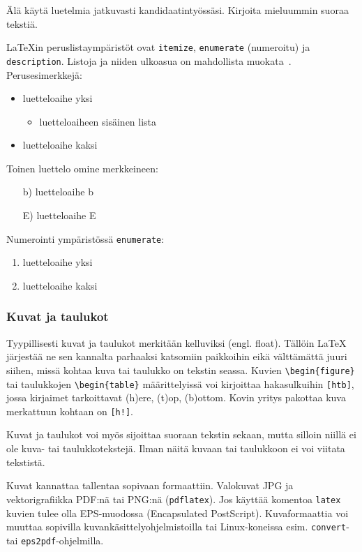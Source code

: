Älä käytä luetelmia jatkuvasti kandidaatintyössäsi. Kirjoita
mieluummin suoraa tekstiä.

\LaTeX{}in peruslistaympäristöt ovat \verb!itemize!, 
\verb!enumerate! (numeroitu)
ja \verb!description!. Listoja ja niiden ulkoasua on
mahdollista muokata~\citep[katso esim.][s. 128]{mittelbach2004}. 
Perusesimerkkejä:
%
\begin{itemize}
\item luetteloaihe yksi
 \begin{itemize}
 \item luetteloaiheen sisäinen lista
 \end{itemize}
\item luetteloaihe kaksi
\end{itemize}

Toinen luettelo omine merkkeineen:
%
\begin{itemize}
\item[b)] luetteloaihe b
\item[E)] luetteloaihe E
\end{itemize}

Numerointi ympäristössä \verb!enumerate!:
%
\begin{enumerate}
\item luetteloaihe yksi
\item luetteloaihe kaksi
\end{enumerate}

\subsubsection{Kuvat ja taulukot}
\label{sec:esimviitteet}

Tyypillisesti kuvat ja taulukot merkitään kelluviksi
(engl. float). Tällöin \LaTeX{} järjestää ne sen kannalta parhaaksi
katsomiin paikkoihin eikä välttämättä juuri siihen, missä kohtaa kuva
tai taulukko on tekstin seassa. Kuvien \verb!\begin{figure}! tai
taulukkojen \verb!\begin{table}! määrittelyissä voi kirjoittaa
hakasulkuihin \verb![htb]!, jossa kirjaimet tarkoittavat (h)ere,
(t)op, (b)ottom.  Kovin yritys pakottaa kuva merkattuun kohtaan on
\verb-[h!]-.

Kuvat ja taulukot voi myös sijoittaa suoraan tekstin sekaan, mutta 
silloin niillä ei ole kuva- tai taulukkotekstejä. Ilman näitä
kuvaan tai taulukkoon ei voi viitata tekstistä.

Kuvat kannattaa tallentaa sopivaan formaattiin. Valokuvat JPG
ja vektorigrafiikka PDF:nä tai PNG:nä (\verb!pdflatex!).
Jos käyttää komentoa \verb!latex! kuvien tulee olla EPS-muodossa 
(Encapsulated PostScript). Kuvaformaattia voi muuttaa sopivilla
kuvankäsittelyohjelmistoilla tai Linux-koneissa esim. 
 \verb!convert!- tai \verb!eps2pdf!-ohjelmilla.

